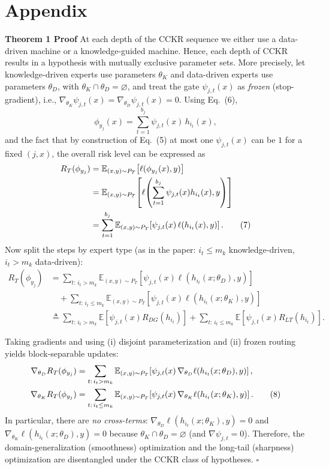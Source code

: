 \documentclass{article}
\begin{document}
\section{Appendix}
\vspace{-22pt}
\noindent\textbf{Theorem 1 Proof}
\label{proof}
At each depth of the CCKR sequence we either use a data-driven machine or a knowledge-guided machine.
Hence, each depth of CCKR results in a hypothesis with mutually exclusive parameter sets.
More precisely, let knowledge-driven experts use parameters $\theta_K$ and data-driven experts use parameters $\theta_D$,
with $\theta_K\cap\theta_D=\varnothing$, and treat the gate $\psi_{j,t}(x)$ as \emph{frozen} (stop-gradient), i.e.,
$\nabla_{\theta_K}\psi_{j,t}(x)=\nabla_{\theta_D}\psi_{j,t}(x)=0$.
Using Eq.~(6),
\[
\phi_{y_j}(x)=\sum_{t=1}^{b_j}\psi_{j,t}(x)\,h_{i_t}(x),
\]
and the fact that by construction of Eq.~(5) at most one $\psi_{j,t}(x)$ can be $1$ for a fixed $(j,x)$, the overall risk
level can be expressed as
{\scriptsize
\begin{align}
\scriptsize
R_T(\phi_{y_j})
&=\mathbb{E}_{(x,y)\sim P_T}\!\left[\ell(\phi_{y_j}(x),y)\right] \nonumber\\
&=\mathbb{E}_{(x,y)\sim P_T}\!\left[\ell\!\left(\sum_{t=1}^{b_j}\psi_{j,t}(x)h_{i_t}(x),y\right)\right] \nonumber\\
&=\sum_{t=1}^{b_j}\mathbb{E}_{(x,y)\sim P_T}\!\left[\psi_{j,t}(x)\,\ell\!\left(h_{i_t}(x),y\right)\right]. \tag{7}
\end{align}
}
Now split the steps by expert type (as in the paper: $i_t\le m_k$ knowledge-driven, $i_t>m_k$ data-driven):
{\scriptsize
\begin{align}
R_T(\phi_{y_j})
&=
\sum_{t:\,i_t>m_k}
\mathbb{E}_{(x,y)\sim P_T}
\!\left[\psi_{j,t}(x)\ell(h_{i_t}(x;\theta_D),y)\right]
\nonumber\\
&\quad+
\sum_{t:\,i_t\le m_k}
\mathbb{E}_{(x,y)\sim P_T}
\!\left[\psi_{j,t}(x)\ell(h_{i_t}(x;\theta_K),y)\right]
\nonumber\\
&\triangleq
\sum_{t:\,i_t>m_k}
\mathbb{E}\!\left[\psi_{j,t}(x)R_{DG}(h_{i_t})\right]
+
\sum_{t:\,i_t\le m_k}
\mathbb{E}\!\left[\psi_{j,t}(x)R_{LT}(h_{i_t})\right].
\end{align}
}

Taking gradients and using (i) disjoint parameterization and (ii) frozen routing yields block-separable updates:
{\scriptsize
\begin{align}
\scriptsize
\nabla_{\theta_D} R_T(\phi_{y_j})
&=\sum_{t:\,i_t>m_k}\mathbb{E}_{(x,y)\sim P_T}\!\left[\psi_{j,t}(x)\,\nabla_{\theta_D}\ell(h_{i_t}(x;\theta_D),y)\right], \nonumber\\
\nabla_{\theta_K} R_T(\phi_{y_j})
&=\sum_{t:\,i_t\le m_k}\mathbb{E}_{(x,y)\sim P_T}\!\left[\psi_{j,t}(x)\,\nabla_{\theta_K}\ell(h_{i_t}(x;\theta_K),y)\right]. \tag{8}
\end{align}
}
In particular, there are \emph{no cross-terms}:
$\nabla_{\theta_D}\ell(h_{i_t}(x;\theta_K),y)=0$ and $\nabla_{\theta_K}\ell(h_{i_t}(x;\theta_D),y)=0$
because $\theta_K\cap\theta_D=\varnothing$ (and $\nabla\psi_{j,t}=0$).
Therefore, the domain-generalization (smoothness) optimization and the long-tail (sharpness) optimization are disentangled
under the CCKR class of hypotheses. \hfill$\square$
\end{document}
